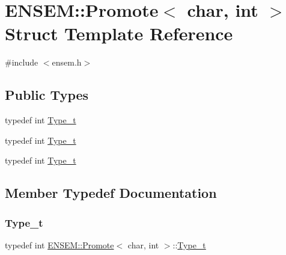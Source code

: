 \hypertarget{structENSEM_1_1Promote_3_01char_00_01int_01_4}{}\section{E\+N\+S\+EM\+:\+:Promote$<$ char, int $>$ Struct Template Reference}
\label{structENSEM_1_1Promote_3_01char_00_01int_01_4}


{\ttfamily \#include $<$ensem.\+h$>$}

\subsection*{Public Types}
\begin{DoxyCompactItemize}
\item 
typedef int \mbox{\hyperlink{structENSEM_1_1Promote_3_01char_00_01int_01_4_a94b5bc0192c5f4da6285165db6fa7ace}{Type\+\_\+t}}
\item 
typedef int \mbox{\hyperlink{structENSEM_1_1Promote_3_01char_00_01int_01_4_a94b5bc0192c5f4da6285165db6fa7ace}{Type\+\_\+t}}
\item 
typedef int \mbox{\hyperlink{structENSEM_1_1Promote_3_01char_00_01int_01_4_a94b5bc0192c5f4da6285165db6fa7ace}{Type\+\_\+t}}
\end{DoxyCompactItemize}


\subsection{Member Typedef Documentation}
\mbox{\label{structENSEM_1_1Promote_3_01char_00_01int_01_4_a94b5bc0192c5f4da6285165db6fa7ace}} 
\subsubsection{\texorpdfstring{Type\_t}{Type\_t}\hspace{0.1cm}{\footnotesize\ttfamily [1/3]}}
{\footnotesize\ttfamily typedef int \mbox{\hyperlink{structENSEM_1_1Promote}{E\+N\+S\+E\+M\+::\+Promote}}$<$ char, int $>$\+::\mbox{\hyperlink{structENSEM_1_1Promote_3_01char_00_01int_01_4_a94b5bc0192c5f4da6285165db6fa7ace}{Type\+\_\+t}}}

\mbox{\label{structENSEM_1_1Promote_3_01char_00_01int_01_4_a94b5bc0192c5f4da6285165db6fa7ace}} 
